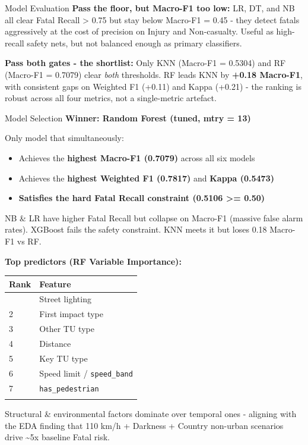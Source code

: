 \documentclass[
  ignorenonframetext,
]{beamer}
\providecommand{\tightlist}{%
  \setlength{\itemsep}{0pt}\setlength{\parskip}{0pt}}
\begin{document}
\begin{frame}{Model Evaluation}
\textbf{Pass the floor, but Macro-F1 too low:} LR, DT, and NB all clear
Fatal Recall \textgreater{} 0.75 but stay below Macro-F1 = 0.45 - they
detect fatals aggressively at the cost of precision on Injury and
Non-casualty. Useful as high-recall safety nets, but not balanced enough
as primary classifiers.

\textbf{Pass both gates - the shortlist:} Only KNN (Macro-F1 = 0.5304)
and RF (Macro-F1 = 0.7079) clear \emph{both} thresholds. RF leads KNN by
\textbf{+0.18 Macro-F1}, with consistent gaps on Weighted F1 (+0.11) and
Kappa (+0.21) - the ranking is robust across all four metrics, not a
single-metric artefact.
\end{frame}

\begin{frame}[fragile]{Model Selection}
\label{model-selection}
\textbf{Winner: Random Forest (tuned, mtry = 13)}

Only model that simultaneously:

\begin{itemize}
\tightlist
\item
  Achieves the \textbf{highest Macro-F1 (0.7079)} across all six models
\item
  Achieves the \textbf{highest Weighted F1 (0.7817)} and \textbf{Kappa
  (0.5473)}
\item
  \textbf{Satisfies the hard Fatal Recall constraint (0.5106
  \textgreater= 0.50)}
\end{itemize}

NB \& LR have higher Fatal Recall but collapse on Macro-F1 (massive
false alarm rates). XGBoost fails the safety constraint. KNN meets it
but loses 0.18 Macro-F1 vs RF.

\textbf{Top predictors (RF Variable Importance):}

\begin{longtable}[]{@{}ll@{}}
\toprule\noalign{}
Rank & Feature \\
\midrule\noalign{}
\endhead
1 & Street lighting \\
2 & First impact type \\
3 & Other TU type \\
4 & Distance \\
5 & Key TU type \\
6 & Speed limit / \texttt{speed\_band} \\
7 & \texttt{has\_pedestrian} \\
\bottomrule\noalign{}
\end{longtable}

Structural \& environmental factors dominate over temporal ones -
aligning with the EDA finding that 110 km/h + Darkness + Country
non-urban scenarios drive \textasciitilde5x baseline Fatal risk.
\end{frame}
\end{document}
